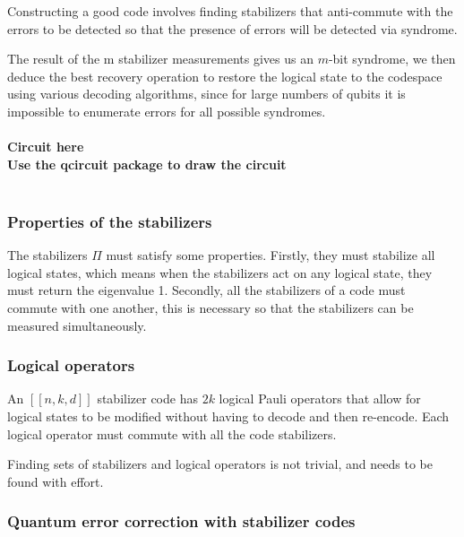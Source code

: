 \documentclass[final,5p,times,twocolumn,authoryear]{elsarticle}
\begin{document}
Constructing a good code involves finding stabilizers that anti-commute with the errors to be detected so that the presence of errors will be detected via syndrome.

The result of the m stabilizer measurements gives us an $m$-bit syndrome, we then deduce the best recovery operation to restore the logical state to the codespace using various decoding algorithms, since for large numbers of qubits it is impossible to enumerate errors for all possible syndromes.
\\
\\
\textbf{Circuit here}
\\
\textbf{Use the qcircuit package to draw the circuit}
\\
\\
\subsubsection{Properties of the stabilizers}

The stabilizers $\Pi$ must satisfy some properties. Firstly, they must stabilize all logical states, which means when the stabilizers act on any logical state, they must return the eigenvalue 1. Secondly, all the stabilizers of a code must commute with one another, this is necessary so that the stabilizers can be measured simultaneously.

\subsubsection{Logical operators}

An $[[n,k,d]]$ stabilizer code has $2k$ logical Pauli operators that allow for logical states to be modified without having to decode and then re-encode. Each logical operator must commute with all the code stabilizers.

Finding sets of stabilizers and logical operators is not trivial, and needs to be found with effort.

\subsubsection{Quantum error correction with stabilizer codes}
\end{document}
